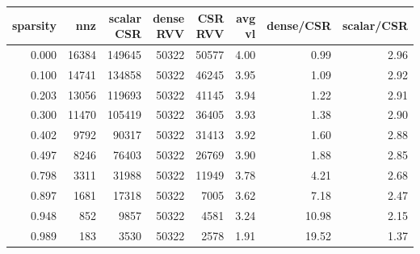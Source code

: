 \begin{tabular}{rrrrrrrr}
\toprule
sparsity & nnz & scalar CSR & dense RVV & CSR RVV & avg vl & dense/CSR & scalar/CSR \\
\midrule
0.000 & 16384 & 149645 & 50322 & 50577 & 4.00 & 0.99 & 2.96 \\
0.100 & 14741 & 134858 & 50322 & 46245 & 3.95 & 1.09 & 2.92 \\
0.203 & 13056 & 119693 & 50322 & 41145 & 3.94 & 1.22 & 2.91 \\
0.300 & 11470 & 105419 & 50322 & 36405 & 3.93 & 1.38 & 2.90 \\
0.402 & 9792 & 90317 & 50322 & 31413 & 3.92 & 1.60 & 2.88 \\
0.497 & 8246 & 76403 & 50322 & 26769 & 3.90 & 1.88 & 2.85 \\
0.798 & 3311 & 31988 & 50322 & 11949 & 3.78 & 4.21 & 2.68 \\
0.897 & 1681 & 17318 & 50322 & 7005 & 3.62 & 7.18 & 2.47 \\
0.948 & 852 & 9857 & 50322 & 4581 & 3.24 & 10.98 & 2.15 \\
0.989 & 183 & 3530 & 50322 & 2578 & 1.91 & 19.52 & 1.37 \\
\bottomrule
\end{tabular}
